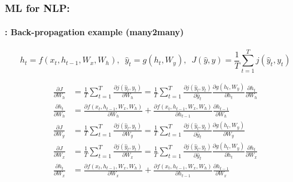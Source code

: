 \documentclass[xcolor=table]{beamer}
\begin{document}
	\begin{frame}
		\frametitle{ML for NLP: \insertsection}
		\framesubtitle{\insertsubsection: Back-propagation example (many2many)}
		
		\[ h_t = f(x_t, h_{t-1}, W_x, W_h),\,\,\, \hat{y}_t = g(h_t, W_y),\,\,\,  J(\hat{y}, y) = \frac{1}{T} \sum_{t=1}^{T} j(\hat{y}_t, y_t)\]
		
		\begin{minipage}{0.6\textwidth}\scriptsize
			\begin{align*}
				\frac{\partial J}{\partial W_h} & = \frac{1}{T} \sum_{t=1}^{T} \frac{\partial j(\hat{y}_t, y_t)}{\partial W_h}
				= \frac{1}{T} \sum_{t=1}^{T} \frac{\partial j(\hat{y}_t, y_t)}{\partial \hat{y}_t} 
				\frac{\partial g(h_t, W_y)}{\partial h_t} 
				\frac{\partial h_t}{\partial W_h} \\
				\frac{\partial h_t}{\partial W_h} & = 
				\frac{\partial f(x_t, h_{t-1}, W_x, W_h)}{\partial W_h} + 
				\frac{\partial f(x_t, h_{t-1}, W_x, W_h)}{\partial h_{t-1}} \frac{\partial h_{t-1}}{\partial W_h} \\
				\frac{\partial J}{\partial W_y} & =
				\frac{1}{T} \sum_{t=1}^{T} \frac{\partial j(\hat{y}_t, y_t)}{\partial W_y}
				= \frac{1}{T} \sum_{t=1}^{T} \frac{\partial j(\hat{y}_t, y_t)}{\partial \hat{y}_t} 
				\frac{\partial g(h_t, W_y)}{\partial W_y} \\
				\frac{\partial J}{\partial W_x} & = 
				\frac{1}{T} \sum_{t=1}^{T} \frac{\partial j(\hat{y}_t, y_t)}{\partial W_x}
				= \frac{1}{T} \sum_{t=1}^{T} \frac{\partial j(\hat{y}_t, y_t)}{\partial \hat{y}_t} 
				\frac{\partial g(h_t, W_y)}{\partial h_t} 
				\frac{\partial h_t}{\partial W_x} \\
				\frac{\partial h_t}{\partial W_x} & = 
				\frac{\partial f(x_t, h_{t-1}, W_x, W_h)}{\partial W_x} + 
				\frac{\partial f(x_t, h_{t-1}, W_x, W_h)}{\partial h_{t-1}} \frac{\partial h_{t-1}}{\partial W_x} \\
			\end{align*}
		\end{minipage}
		\begin{minipage}{0.38\textwidth}
		\end{minipage}
		
	\end{frame}
\end{document}
